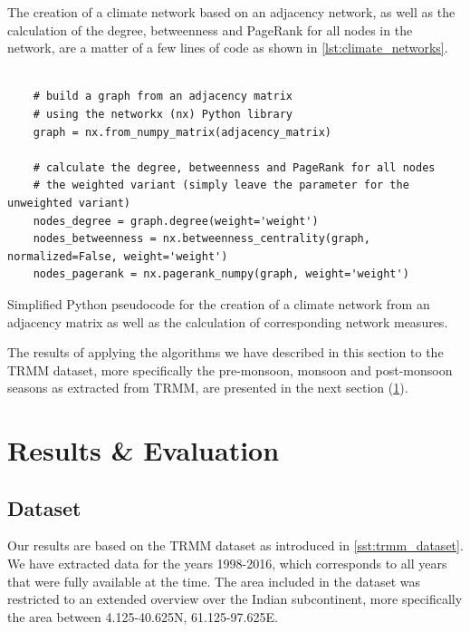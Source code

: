The creation of a climate network based on an adjacency network, as well as the calculation of the degree, betweenness and PageRank for all nodes in the network, are a matter of a few lines of code as shown in \cref{lst:climate_networks}.

\begin{listing}[H]
  \begin{verbatim}

    # build a graph from an adjacency matrix
    # using the networkx (nx) Python library
    graph = nx.from_numpy_matrix(adjacency_matrix)

    # calculate the degree, betweenness and PageRank for all nodes
    # the weighted variant (simply leave the parameter for the unweighted variant)
    nodes_degree = graph.degree(weight='weight')
    nodes_betweenness = nx.betweenness_centrality(graph, normalized=False, weight='weight')
    nodes_pagerank = nx.pagerank_numpy(graph, weight='weight')

  \end{verbatim}
  \caption{Simplified Python pseudocode for the creation of a climate network from an adjacency matrix as well as the calculation of corresponding network measures.}
  \label{lst:climate_networks}
\end{listing}

The results of applying the algorithms we have described in this section to the TRMM dataset, more specifically the pre-monsoon, monsoon and post-monsoon seasons as extracted from TRMM, are presented in the next section (\cref{st:event_sync_results}).

\section{Results \& Evaluation}
\label{st:event_sync_results}


\subsection{Dataset}
Our results are based on the TRMM dataset as introduced in \cref{sst:trmm_dataset}. We have extracted data for the years 1998-2016, which corresponds to all years that were fully available at the time. The area included in the dataset was restricted to an extended overview over the Indian subcontinent, more specifically the area between 4.125-40.625N, 61.125-97.625E.


